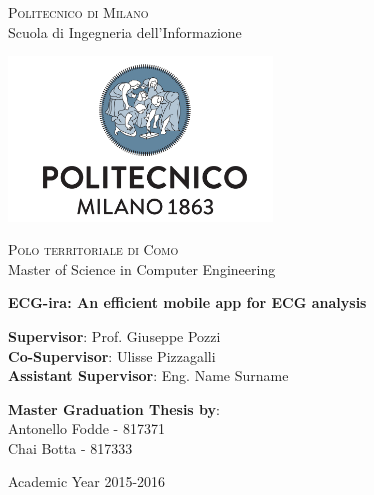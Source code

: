 \thispagestyle{empty}

\begin{center}

	\textsc{Politecnico di Milano}\\
 	Scuola di Ingegneria dell'Informazione\\  

 	\par\vskip 0.2cm

 	\includegraphics[width=7cm]{figures/polimi_logo.png}\\
  
 	\par\vskip 0.2cm  
  
  	\textsc{Polo territoriale di Como}\\
  	Master of Science in Computer Engineering\\  


  	\par\vskip 2cm
  	
\LARGE{ \bf	ECG-ira: An efficient mobile app for ECG analysis}


		
\end{center}

\par\vskip 1.5cm

\begin{flushleft}
  	\textbf{Supervisor}: Prof. Giuseppe Pozzi\\
  	\textbf{Co-Supervisor}: Ulisse Pizzagalli\\
    \textbf{Assistant Supervisor}: Eng. Name Surname\\
\end{flushleft}

\par\vskip 1cm

\begin{flushleft}
  	\textbf{Master Graduation Thesis by}: \\
  	Antonello Fodde - 817371 \\ 
  	Chai Botta - 817333 \\  
\end{flushleft}

\par\vskip 1cm

\begin{center}
 	Academic Year 2015-2016
\end{center}




